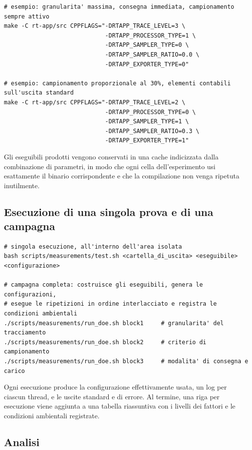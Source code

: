 \documentclass[11pt,a4paper]{article}
\begin{document}
\begin{lstlisting}
# esempio: granularita' massima, consegna immediata, campionamento sempre attivo
make -C rt-app/src CPPFLAGS="-DRTAPP_TRACE_LEVEL=3 \
                             -DRTAPP_PROCESSOR_TYPE=1 \
                             -DRTAPP_SAMPLER_TYPE=0 \
                             -DRTAPP_SAMPLER_RATIO=0.0 \
                             -DRTAPP_EXPORTER_TYPE=0"

# esempio: campionamento proporzionale al 30%, elementi contabili sull'uscita standard
make -C rt-app/src CPPFLAGS="-DRTAPP_TRACE_LEVEL=2 \
                             -DRTAPP_PROCESSOR_TYPE=0 \
                             -DRTAPP_SAMPLER_TYPE=1 \
                             -DRTAPP_SAMPLER_RATIO=0.3 \
                             -DRTAPP_EXPORTER_TYPE=1"
\end{lstlisting}

Gli eseguibili prodotti vengono conservati in una cache indicizzata dalla combinazione di
parametri, in modo che ogni cella dell'esperimento usi esattamente il binario corrispondente e che
la compilazione non venga ripetuta inutilmente.

\subsection{Esecuzione di una singola prova e di una campagna}

\begin{lstlisting}
# singola esecuzione, all'interno dell'area isolata
bash scripts/measurements/test.sh <cartella_di_uscita> <eseguibile> <configurazione>

# campagna completa: costruisce gli eseguibili, genera le configurazioni,
# esegue le ripetizioni in ordine interlacciato e registra le condizioni ambientali
./scripts/measurements/run_doe.sh block1     # granularita' del tracciamento
./scripts/measurements/run_doe.sh block2     # criterio di campionamento
./scripts/measurements/run_doe.sh block3     # modalita' di consegna e carico
\end{lstlisting}

Ogni esecuzione produce la configurazione effettivamente usata, un log per ciascun thread, e le
uscite standard e di errore. Al termine, una riga per esecuzione viene aggiunta a una tabella
riassuntiva con i livelli dei fattori e le condizioni ambientali registrate.

\subsection{Analisi}
\end{document}

